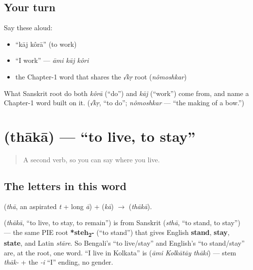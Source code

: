 \subsection*{Your turn}
Say these aloud:

\begin{itemize}
\raggedright
  \item \textquotedblleft{}kāj kôrā\textquotedblright{} (to work)
  \item \textquotedblleft{}I work\textquotedblright{} — \emph{āmi kāj kôri}
  \item the Chapter-1 word that shares the \emph{√kṛ} root (\emph{nômoshkar})
\end{itemize}

\begin{tcolorbox}[breakable,colback=teal!4,colframe=teal!35!black,title={Before you move on}]
What Sanskrit root do both \emph{kôrā} (\textquotedblleft{}do\textquotedblright{}) and \emph{kāj} (\textquotedblleft{}work\textquotedblright{}) come from, and name a Chapter-1 word built on it. (\emph{√kṛ}, \textquotedblleft{}to do\textquotedblright{}; \emph{nômoshkar} — \textquotedblleft{}the making of a bow.\textquotedblright{})
\end{tcolorbox}
\section[\bn{থাকা}]{ (thākā) — \textquotedblleft{}to live, to stay\textquotedblright{}}

\label{lesson:BN-C05-thaka}



\begin{quote}
A second verb, so you can say where you live.
\end{quote}

\subsection*{The letters in this word}
\textbf{} (\emph{thā}, an aspirated \emph{t} + long \emph{ā}) + \textbf{} (\emph{kā}) $\to$ \textbf{} (\emph{thākā}).

\begin{cousinweb}
\textbf{} (\emph{thākā}, \textquotedblleft{}to live, to stay, to remain\textquotedblright{}) is from Sanskrit \textbf{} (\emph{sthā}, \textquotedblleft{}to stand, to stay\textquotedblright{}) — the same PIE root \textbf{*steh\textsubscript{2}-} (\textquotedblleft{}to stand\textquotedblright{}) that gives English \textbf{stand}, \textbf{stay}, \textbf{state}, and Latin \emph{stāre}. So Bengali's \textquotedblleft{}to live/stay\textquotedblright{} and English's \textquotedblleft{}to stand/stay\textquotedblright{} are, at the root, one word. \textquotedblleft{}I live in Kolkata\textquotedblright{} is \textbf{  } (\emph{āmi Kolkātāy thāki}) — stem \emph{thāk-} + the \emph{-i} \textquotedblleft{}I\textquotedblright{} ending, no gender.
\end{cousinweb}

